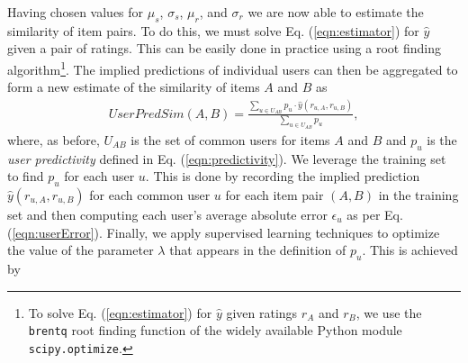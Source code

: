\documentclass[11pt]{article}
\begin{document}
Having chosen values for $\mu_s$, $\sigma_s$, $\mu_r$, and $\sigma_r$ we are now
able to estimate the similarity of item pairs. To do this, we must solve Eq.
(\ref{eqn:estimator}) for $\hat{y}$ given a pair of ratings. This can be easily
done in practice using a root finding algorithm\footnote{To solve Eq.
(\ref{eqn:estimator}) for $\hat{y}$ given ratings $r_A$ and $r_B$, we use the
{\tt brentq} root finding function of the widely available Python module {\tt
scipy.optimize}.}. The implied predictions of individual users can then be
aggregated to form a new estimate of the similarity of items $A$ and $B$ as
\begin{align}\label{eqn:userPredSim}
UserPredSim(A,B) = \frac{\sum_{u \in U_{AB}}{p_u\cdot\hat{y}(r_{u,A}, r_{u,B})}}
{\sum_{u \in U_{AB}}{p_u}},
\end{align}
where, as before, $U_{AB}$ is the set of common users for items $A$ and $B$ and
$p_u$ is the {\em user predictivity} defined in Eq. (\ref{eqn:predictivity}). We
leverage the training set to find $p_u$ for each user $u$. This is done by
recording the implied prediction $\hat{y}(r_{u,A},r_{u,B})$ for each common user
$u$ for each item pair $(A, B)$ in the training set and then computing each
user's average absolute error $\epsilon_u$ as per Eq. (\ref{eqn:userError}).
Finally, we apply supervised learning techniques to optimize the value of the
parameter $\lambda$ that appears in the definition of $p_u$. This is achieved by
\end{document}
